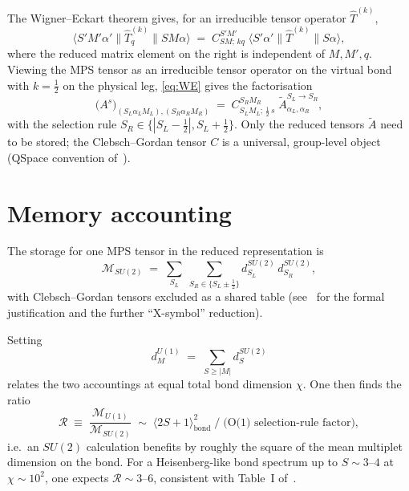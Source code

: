 \documentclass[11pt,a4paper]{article}
\newcommand{\mem}{\mathcal{M}}
\begin{document}
The Wigner--Eckart theorem gives, for an irreducible tensor operator $\hat T^{(k)}$,
\begin{equation}
\langle S' M' \alpha' \| \hat T^{(k)}_q \| S M \alpha\rangle
\;=\;
C^{S'M'}_{S M;\,k q}\;\langle S'\alpha' \| \hat T^{(k)} \| S\alpha\rangle,
\label{eq:WE}
\end{equation}
where the reduced matrix element on the right is independent of $M,M',q$. Viewing the MPS tensor as an irreducible tensor operator on the virtual bond with $k=\tfrac12$ on the physical leg, \eqref{eq:WE} gives the factorisation
\begin{equation}
\bigl(A^{s}\bigr)_{(S_L \alpha_L M_L),(S_R \alpha_R M_R)}
\;=\;
C^{S_R M_R}_{S_L M_L;\,\tfrac12\, s}\;\tilde A^{S_L \to S_R}_{\alpha_L,\alpha_R},
\end{equation}
with the selection rule $S_R \in \{|S_L - \tfrac12|, S_L + \tfrac12\}$. Only the reduced tensors $\tilde A$ need to be stored; the Clebsch--Gordan tensor $C$ is a universal, group-level object (QSpace convention of~\cite{Weichselbaum2012}).

\section{Memory accounting}

The storage for one MPS tensor in the reduced representation is
\begin{equation}
\boxed{\;\mem_{SU(2)} \;=\; \sum_{S_L}\;\sum_{S_R \in \{S_L \pm \tfrac12\}} d^{SU(2)}_{S_L}\, d^{SU(2)}_{S_R},\;}
\label{eq:MSU2}
\end{equation}
with Clebsch--Gordan tensors excluded as a shared table (see~\cite{Weichselbaum2012,Weichselbaum2020Xsym} for the formal justification and the further ``X-symbol'' reduction).

Setting
\begin{equation}
d^{U(1)}_M \;=\; \sum_{S \ge |M|} d^{SU(2)}_S
\label{eq:U1fromSU2}
\end{equation}
relates the two accountings at equal total bond dimension $\chi$. One then finds the ratio
\begin{equation}
\mathcal R
\;\equiv\;
\frac{\mem_{U(1)}}{\mem_{SU(2)}}
\;\sim\;
\bigl\langle 2S+1\bigr\rangle^{2}_{\mathrm{bond}}
\;/\;\text{(O(1) selection-rule factor)},
\label{eq:ratio}
\end{equation}
i.e.\ an $SU(2)$ calculation benefits by roughly the square of the mean multiplet dimension on the bond. For a Heisenberg-like bond spectrum up to $S \sim 3$--$4$ at $\chi \sim 10^2$, one expects $\mathcal R \sim 3$--$6$, consistent with Table~I of~\cite{McCulloch2001}.
\end{document}
